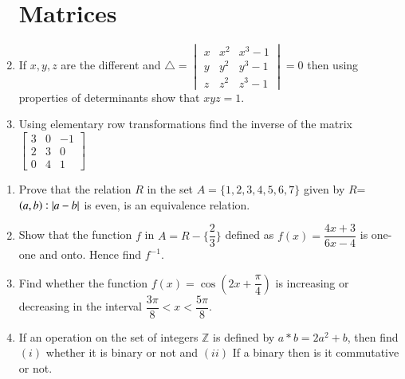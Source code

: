 \documentclass[12pt,-letter paper]{article}
\providecommand{\brak}[1]{\ensuremath{\left(#1\right)}}
\begin{document}
\begin{enumerate}

\section*{Matrices}

\item If $x,y,z$ are the different and $\triangle =
                    \begin{vmatrix}    
		                      x & x^2 & x^3-1\\
				      y & y^2 & y^3-1\\
				      z & z^2 & z^3-1
                    \end{vmatrix}=0$  then using properties of determinants show that $xyz=1$.

\item Using elementary row transformations find the inverse of the matrix
		$\begin{bmatrix}
			3 & 0 &-1\\
			2 & 3 & 0\\
			0 & 4 &1
		\end{bmatrix}$
\end{enumerate}

\begin{enumerate}

\section*{Functions and Relations}

\item Prove that the relation $R$ in the set $A=\{1,2,3,4,5,6,7\}$ given by $R$=$\brak{a,b} : \abs{a-b}$ is even, is an equivalence relation.

\item Show that the function $f$ in $A=R-\{\dfrac{2}{3}\}$ defined as $f(x)=\dfrac{4x+3}{6x-4}$ is one-one and onto. Hence find $f^{-1}$. 

\item Find whether the function $f(x)=\cos\brak{2x+\dfrac{\pi}{4}}$ is increasing or decreasing in the interval $\dfrac{3\pi}{8}<x<\dfrac{5\pi}{8}$.

\item If an operation on the set of integers $\mathbb{Z}$ is defined by $a*b=2a^2+b$, then find $(i)$ whether it is binary or not and $(ii)$ If a binary  then is it commutative or not.

\end{enumerate}
\end{document}
